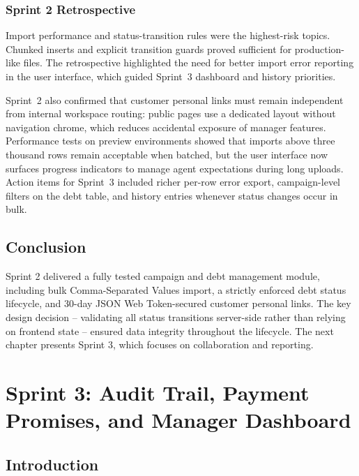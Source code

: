\documentclass[12pt,a4paper]{report}
\begin{document}
\subsection{Sprint 2 Retrospective}

Import performance and status-transition rules were the highest-risk topics.
Chunked inserts and explicit transition guards proved sufficient for production-like files.
The retrospective highlighted the need for better import error reporting in the user interface,
which guided Sprint~3 dashboard and history priorities.

Sprint~2 also confirmed that customer personal links must remain independent from internal
workspace routing: public pages use a dedicated layout without navigation chrome, which
reduces accidental exposure of manager features.
Performance tests on preview environments showed that imports above three thousand rows remain
acceptable when batched, but the user interface now surfaces progress indicators to manage agent
expectations during long uploads.
Action items for Sprint~3 included richer per-row error export, campaign-level filters on the debt
table, and history entries whenever status changes occur in bulk.

\section*{Conclusion}
{}

Sprint 2 delivered a fully tested campaign and debt management module, including bulk
Comma-Separated Values import, a strictly enforced debt status lifecycle, and 30-day JSON Web Token-secured
customer personal links.
The key design decision -- validating all status transitions server-side rather than
relying on frontend state -- ensured data integrity throughout the lifecycle.
The next chapter presents Sprint 3, which focuses on collaboration and reporting.

\clearpage
\chapter{Sprint 3: Audit Trail, Payment Promises, and Manager Dashboard}
\label{chap:sprint3}

\section*{Introduction}
{}
\end{document}
